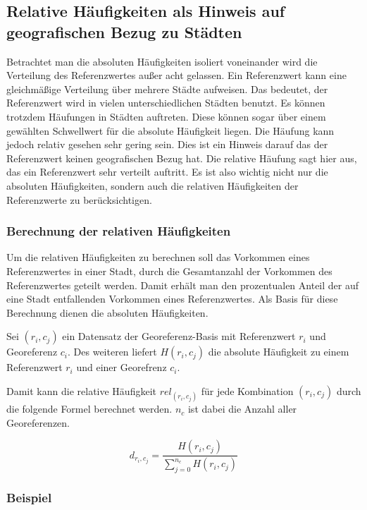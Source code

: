 		\subsection{Relative Häufigkeiten als Hinweis auf geografischen Bezug zu Städten}

			Betrachtet man die absoluten Häufigkeiten isoliert voneinander wird die Verteilung des Referenzwertes außer acht gelassen. 
			Ein Referenzwert kann eine gleichmäßige Verteilung über mehrere Städte aufweisen.
			Das bedeutet, der Referenzwert wird in vielen unterschiedlichen Städten benutzt. 
			Es können trotzdem Häufungen in Städten auftreten.
			Diese können sogar über einem gewählten Schwellwert für die absolute Häufigkeit liegen.
			Die Häufung kann jedoch relativ gesehen sehr gering sein.
			Dies ist ein Hinweis darauf das der Referenzwert keinen geografischen Bezug hat.
			Die relative Häufung sagt hier aus, das ein Referenzwert sehr verteilt auftritt. 
			Es ist also wichtig nicht nur die absoluten Häufigkeiten, sondern auch die relativen Häufigkeiten der Referenzwerte zu berücksichtigen.

			\subsubsection{Berechnung der relativen Häufigkeiten}  

				Um die relativen Häufigkeiten zu berechnen soll das Vorkommen eines Referenzwertes in einer Stadt, durch die Gesamtanzahl der Vorkommen des Referenzwertes geteilt werden.
				Damit erhält man den prozentualen Anteil der auf eine Stadt entfallenden Vorkommen eines Referenzwertes.
				Als Basis für diese Berechnung dienen die absoluten Häufigkeiten.

				Sei $(r_i,c_j)$ ein Datensatz der Georeferenz-Basis mit Referenzwert $r_i$ und Georeferenz $c_i$.
				Des weiteren liefert $H(r_{i},c_{j})$ die absolute Häufigkeit zu einem Referenzwert $r_i$ und einer Georefrenz $c_i$. 

				Damit kann die relative Häufigkeit $rel_{(r_i,c_j)}$ für jede Kombination $(r_i,c_j)$ durch die folgende Formel berechnet werden. 
				$n_c$ ist dabei die Anzahl aller Georeferenzen.

				\begin{equation}
					d_{r_i,c_j}=\frac{H(r_i,c_j)}{\sum^{n_c}_{j=0}{H(r_i,c_j)}}
				\end{equation}	

			\subsubsection{Beispiel} 

